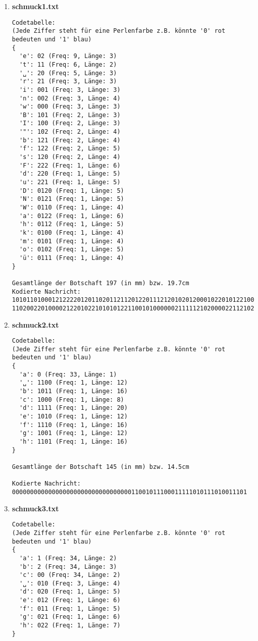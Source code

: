 \documentclass[a4paper,10pt,ngerman]{scrartcl}
\begin{document}
\begin{enumerate}
  \item \textbf{schmuck1.txt}
\begin{verbatim}
Codetabelle:
(Jede Ziffer steht für eine Perlenfarbe z.B. könnte '0' rot bedeuten und '1' blau)
{
  'e': 02 (Freq: 9, Länge: 3)
  't': 11 (Freq: 6, Länge: 2)
  '␣': 20 (Freq: 5, Länge: 3)
  'r': 21 (Freq: 3, Länge: 3)
  'i': 001 (Freq: 3, Länge: 3)
  'n': 002 (Freq: 3, Länge: 4)
  'w': 000 (Freq: 3, Länge: 3)
  'B': 101 (Freq: 2, Länge: 3)
  'I': 100 (Freq: 2, Länge: 3)
  '"': 102 (Freq: 2, Länge: 4)
  'b': 121 (Freq: 2, Länge: 4)
  'f': 122 (Freq: 2, Länge: 5)
  's': 120 (Freq: 2, Länge: 4)
  'F': 222 (Freq: 1, Länge: 6)
  'd': 220 (Freq: 1, Länge: 5)
  'u': 221 (Freq: 1, Länge: 5)
  'D': 0120 (Freq: 1, Länge: 5)
  'N': 0121 (Freq: 1, Länge: 5)
  'W': 0110 (Freq: 1, Länge: 4)
  'a': 0122 (Freq: 1, Länge: 6)
  'h': 0112 (Freq: 1, Länge: 5)
  'k': 0100 (Freq: 1, Länge: 4)
  'm': 0101 (Freq: 1, Länge: 4)
  'o': 0102 (Freq: 1, Länge: 5)
  'ü': 0111 (Freq: 1, Länge: 4)
}

Gesamtlänge der Botschaft 197 (in mm) bzw. 19.7cm
Kodierte Nachricht: 101011010001212222012011020112112012201112120102012000102201012210022200212000002001
1102002201000021220102210101012211001010000002111112102000022112102102
\end{verbatim}
  \item \textbf{schmuck2.txt}
\begin{verbatim}
Codetabelle:
(Jede Ziffer steht für eine Perlenfarbe z.B. könnte '0' rot bedeuten und '1' blau)
{
  'a': 0 (Freq: 33, Länge: 1)
  '␣': 1100 (Freq: 1, Länge: 12)
  'b': 1011 (Freq: 1, Länge: 16)
  'c': 1000 (Freq: 1, Länge: 8)
  'd': 1111 (Freq: 1, Länge: 20)
  'e': 1010 (Freq: 1, Länge: 12)
  'f': 1110 (Freq: 1, Länge: 16)
  'g': 1001 (Freq: 1, Länge: 12)
  'h': 1101 (Freq: 1, Länge: 16)
}

Gesamtlänge der Botschaft 145 (in mm) bzw. 14.5cm

Kodierte Nachricht: 00000000000000000000000000000000011001011100011111010111010011101
\end{verbatim}
  \item \textbf{schmuck3.txt}
\begin{verbatim}
Codetabelle:
(Jede Ziffer steht für eine Perlenfarbe z.B. könnte '0' rot bedeuten und '1' blau)
{
  'a': 1 (Freq: 34, Länge: 2)
  'b': 2 (Freq: 34, Länge: 3)
  'c': 00 (Freq: 34, Länge: 2)
  '␣': 010 (Freq: 3, Länge: 4)
  'd': 020 (Freq: 1, Länge: 5)
  'e': 012 (Freq: 1, Länge: 6)
  'f': 011 (Freq: 1, Länge: 5)
  'g': 021 (Freq: 1, Länge: 6)
  'h': 022 (Freq: 1, Länge: 7)
}


\end{verbatim}
\end{enumerate}
\end{document}

